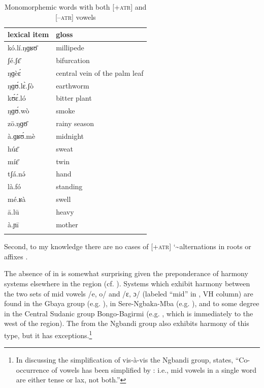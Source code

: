 \documentclass[output=paper,colorlinks,citecolor=brown]{langscibook}
\begin{document}
\begin{table}
\caption{Monomorphemic words with both [+\textsc{atr}] and [–\textsc{atr}] vowels}
\label{tab:olson:15}
    \begin{tabular}{ll}
    \lsptoprule
        lexical item & gloss\\
    \midrule
        kó.lí.ŋɡʁʊ̄ & millipede\\
        ʃé.ʃɛ̄ & bifurcation\\
        ŋɡèɛ́ & central vein of the palm leaf\\
        ŋɡʊ́.lɛ̀.ʃò & earthworm\\
        kʊ́ɛ́.ló & bitter plant\\
        ŋɡʊ́.wò & smoke\\
        zō.ŋɡʊ̄ & rainy season\\
        à.ɡʁʊ́.mè & midnight\\
        húɛ̄ & sweat\\
        míɛ̄ & twin\\
        tʃá.nə́ & hand\\
        là.fó & standing\\
        mé.ʁà & swell\\
        ā.lū & heavy\\
        à.ɲī & mother\\
    \lspbottomrule
    \end{tabular}
\end{table}

Second, to my knowledge there are no cases of [+\textsc{atr}] \char`\~  alternations in  roots or affixes \citep[500]{Casali2008}.

The absence of  in  is somewhat surprising given the preponderance of harmony systems elsewhere in the region (cf. ). Systems which exhibit harmony between the two sets of mid vowels /e, o/ and /ɛ, ɔ/ (labeled “mid” in , VH column) are found in the Gbaya  group (e.g. ), in Sere-Ngbaka-Mba  (e.g. ), and to some degree in the Central Sudanic  group Bongo-Bagirmi  (e.g. , which is immediately to the west of the  region). The   from the Ngbandi  group also exhibits harmony of this type, but it has exceptions.\footnote{In discussing the simplification of  vis-à-vis the Ngbandi  group, \citet[313]{Samarin2000} states, “Co-occurrence of vowels has been simplified by : i.e., mid vowels in a single word are either tense or lax, not both.”}
\end{document}
